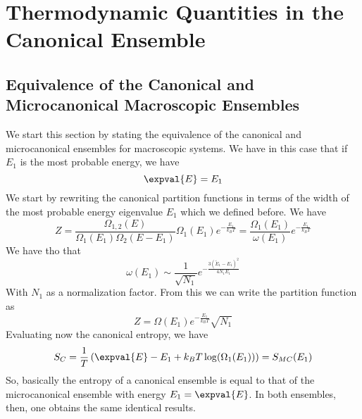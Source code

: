 \documentclass[a4paper, 11pt]{book}
\newcommand{\1}{\opr{\mathds{1}}}
\theoremstyle{plain}
\begin{document}
		\section{Thermodynamic Quantities in the Canonical Ensemble}
		\subsection{Equivalence of the Canonical and Microcanonical Macroscopic Ensembles}
		We start this section by stating the equivalence of the canonical and microcanonical ensembles for macroscopic systems. We have in this case that if $E_1$ is the most probable energy, we have
		\begin{equation}
			\expval{E}=E_1
			\label{eq:canonicalequvalence}
		\end{equation}
		We start by rewriting the canonical partition functions in terms of the width of the most probable energy eigenvalue $E_1$ which we defined before. We have
		\begin{equation}
			Z=\frac{\Omega_{1,2}(E)}{\Omega_1(E_1)\Omega_2(E-E_1)}\Omega_1(E_1)e^{-\frac{E_1}{k_BT}}=\frac{\Omega_1(E_1)}{\omega(E_1)}e^{-\frac{E_1}{k_BT}}
			\label{eq:newpartitionfunction}
		\end{equation}
		We have tho that
		\begin{equation*}
			\omega(E_1)\sim \frac{1}{\sqrt{N_1}}e^{-\frac{3(\tilde{E}_1-E_1)^2}{4N_1E_1}}
		\end{equation*}
		With $N_1$ as a normalization factor. From this we can write the partition function as
		\begin{equation}
			Z=\Omega(E_1)e^{-\frac{E_1}{k_BT}}\sqrt{N_1}
			\label{eq:partitionfunctionequivalencenew}
		\end{equation}
		Evaluating now the canonical entropy, we have
		\begin{equation}
			S_C=\frac{1}{T}\left( \expval{E}-E_1+k_BT\log(\Omega_1(E_1)) \right)=S_{MC}(E_1)
			\label{eq:entropyequivalence}
		\end{equation}
		So, basically the entropy of a canonical ensemble is equal to that of the microcanonical ensemble with energy $E_1=\expval{E}$. In both ensembles, then, one obtains the same identical results.
\end{document}

